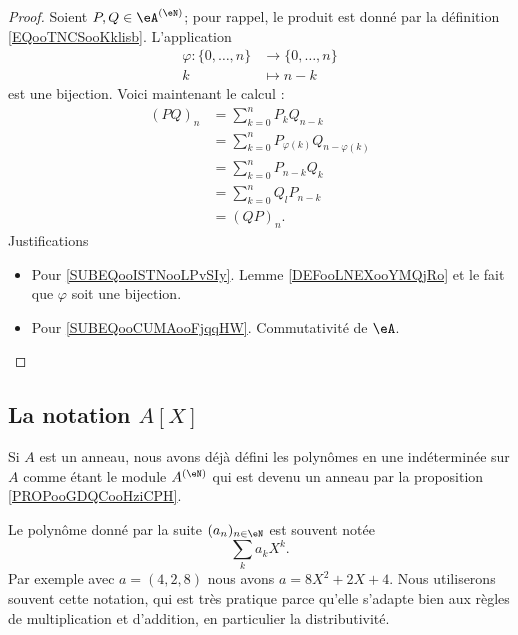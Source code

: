 \begin{proof}
    Soient \( P,Q\in \eA^{(\eN)}\); pour rappel, le produit est donné par la définition \ref{EQooTNCSooKklisb}. L'application
    \begin{equation}
        \begin{aligned}
            \varphi\colon \{ 0,\ldots, n \}&\to \{ 0,\ldots, n \} \\
            k&\mapsto n-k 
        \end{aligned}
    \end{equation}
    est une bijection. Voici maintenant le calcul :
    \begin{subequations}
        \begin{align}
            (PQ)_n&=\sum_{k=0}^nP_kQ_{n-k}\\
            &=\sum_{k=0}^nP_{\varphi(k)}Q_{n-\varphi(k)}    \label{SUBEQooISTNooLPvSIy} \\
            &=\sum_{k=0}^nP_{n-k}Q_{k}\\
            &=\sum_{k=0}^nQ_lP_{n-k}      \label{SUBEQooCUMAooFjqqHW}\\
            &=(QP)_n.
        \end{align}
    \end{subequations}
    Justifications
    \begin{itemize}
        \item Pour \eqref{SUBEQooISTNooLPvSIy}. Lemme \ref{DEFooLNEXooYMQjRo} et le fait que \( \varphi\) soit une bijection.
        \item Pour \eqref{SUBEQooCUMAooFjqqHW}. Commutativité de \( \eA\).
    \end{itemize}
\end{proof}


\subsection{La notation \texorpdfstring{$ A[X]$}{A[X]}}
\label{SUBSECooLEKVooFBPSJz}

Si \( A\) est un anneau, nous avons déjà défini les polynômes en une indéterminée sur \( A\) comme étant le module \( A^{(\eN)}\) qui est devenu un anneau par la proposition \ref{PROPooGDQCooHziCPH}.

Le polynôme donné par la suite \( (a_n)_{n\in \eN}\) est souvent notée
\begin{equation}
    \sum_ka_kX^k.
\end{equation}
Par exemple avec \( a=(4,2,8)\) nous avons \( a=8X^2+2X+4\). Nous utiliserons souvent cette notation, qui est très pratique parce qu'elle s'adapte bien aux règles de multiplication et d'addition, en particulier la distributivité.

